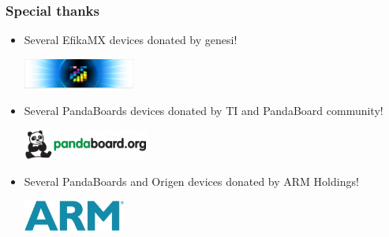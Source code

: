 \documentclass{beamer}
\begin{document}
\begin{frame}[t]
\frametitle{Special thanks}
\begin{itemize}
   \item Several EfikaMX devices donated by genesi!
   \begin{center}
   \includegraphics[height=1cm]{genesi.jpg}
   \end{center}
   \item Several PandaBoards devices donated by TI and PandaBoard community!
   \begin{center}
   \includegraphics[height=1cm]{panda.png}
   \end{center}
   \item Several PandaBoards and Origen devices donated by ARM Holdings!
   \begin{center}
   \includegraphics[height=1cm]{arm.jpg}
   \end{center}
\end{itemize}
\end{frame}
\end{document}
